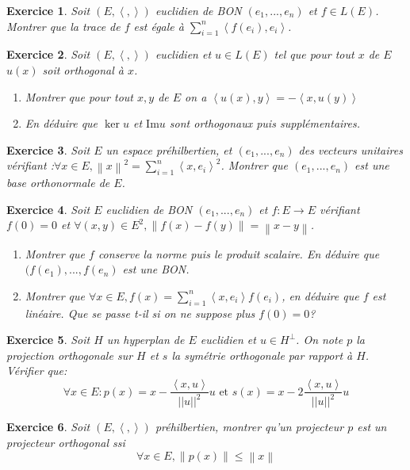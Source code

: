 \documentclass[12pt,a4paper]{article}
\newcommand{\norme}[1]{\left\lVert#1\right\rVert}
\newcommand{\ps}[2]{\left\langle#1,#2\right\rangle}
\theoremstyle{break}
\newtheorem{Exo}{Exercice}
\begin{document}
\begin{Exo}
	Soit $(E,\ps{}{})$ euclidien de BON $(e_1,...,e_n)$ et $f\in L(E)$. Montrer que la trace de $f$ est égale à $\sum_{i=1}^n\ps{f(e_i)}{e_i}$.
\end{Exo}

\begin{Exo}
	
	Soit $(E,\ps{}{})$ euclidien et $u\in L(E)$ tel que pour tout $x$ de $E$ $u(x)$ soit orthogonal à $x$.
\begin{enumerate}
	\item
	Montrer que pour tout $x,y$ de $E$ on a $\ps{u(x)}{y}=-\ps{x}{u(y)}$
	\item En déduire que $\ker u$ et $\mathrm{Im} u$ sont orthogonaux puis supplémentaires.
\end{enumerate}

\end{Exo}

\begin{Exo}
Soit $ E  $ un espace préhilbertien, et $ \left( e_{1},...,e_{n}\right)  $ des
vecteurs unitaires v\'{e}rifiant :$\forall x\in E,\left\| x\right\| ^{2}=\sum_{i=1}^{n}\left\langle
x,e_{i}\right\rangle ^{2}$.
Montrer que $ \left( e_{1},...,e_{n}\right) $  est une base orthonormale de $E$.
\end{Exo}

\begin{Exo}
Soit $E$ euclidien de BON $(e_1,...,e_n)$ et $f:E\to E$ vérifiant $f(0)=0$ et $\forall (x,y)\in E^2,\norme{f(x)-f(y)}=\norme{x-y}$.
\begin{enumerate}
\item Montrer que $f$ conserve la norme puis le produit scalaire. En déduire que $(f(e_1),...,f(e_n)$ est une BON.
\item Montrer que $\forall x\in E,f(x)=\sum_{i=1}^n\ps{x}{e_i}f(e_i)$, en déduire que $f$ est linéaire. Que se passe t-il si on ne suppose plus $f(0)=0$?
\end{enumerate}
\end{Exo}

\begin{Exo}
Soit $H$ un hyperplan de $E$ euclidien et $u\in H^{\perp}$. On note $p$ la projection orthogonale sur $H$ et $s$ la symétrie orthogonale par rapport à $H$. Vérifier que:
$$\forall x \in E:p(x)=x-\frac{\ps{x}{u}}{||u||^2}u\text{ et } s(x)=x-2\frac{\ps{x}{u}}{||u||^2}u$$
\end{Exo}

\begin{Exo}
Soit $(E,\ps{}{})$ préhilbertien, montrer qu'un projecteur $p$ est un projecteur orthogonal ssi $$\forall x\in E,\norme{p(x)}\leq \norme{x}$$
\end{Exo}
\end{document}
